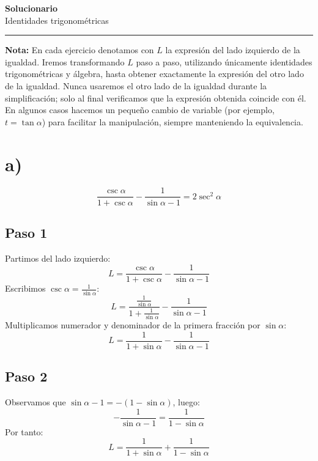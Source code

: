 \documentclass[12pt,a4paper]{article}
\begin{document}
\begin{center}

{\Huge \textbf{Solucionario}} \\[0.3cm]

{\LARGE Identidades trigonométricas}

\vspace{0.5cm}

\rule{0.9\textwidth}{0.5pt}

\end{center}

\vspace{0.8cm}

\noindent
\textbf{Nota:} En cada ejercicio denotamos con \(L\) la expresión del lado izquierdo de la igualdad. 
Iremos transformando \(L\) paso a paso, utilizando únicamente identidades trigonométricas y álgebra, 
hasta obtener exactamente la expresión del otro lado de la igualdad. Nunca usaremos el otro lado de la igualdad durante la simplificación; solo al final verificamos que la expresión obtenida coincide con él. 
En algunos casos hacemos un pequeño cambio de variable (por ejemplo, \(t = \tan\alpha\)) 
para facilitar la manipulación, siempre manteniendo la equivalencia.



\section*{a)}

\begin{identidad}
\[
\frac{\csc\alpha}{1+\csc\alpha}
-
\frac1{\sin\alpha-1}
=
2\sec^2\alpha
\]
\end{identidad}

\subsection*{Paso 1}
Partimos del lado izquierdo:
\[
L = \frac{\csc\alpha}{1+\csc\alpha} - \frac1{\sin\alpha-1}
\]
Escribimos \(\csc\alpha = \frac1{\sin\alpha}\):
\[
L = \frac{\frac1{\sin\alpha}}{1+\frac1{\sin\alpha}} - \frac1{\sin\alpha-1}
\]
Multiplicamos numerador y denominador de la primera fracción por \(\sin\alpha\):
\[
L = \frac1{1+\sin\alpha} - \frac1{\sin\alpha-1}
\]

\subsection*{Paso 2}
Observamos que \(\sin\alpha-1 = -(1-\sin\alpha)\), luego:
\[
-\frac1{\sin\alpha-1} = \frac1{1-\sin\alpha}
\]
Por tanto:
\[
L = \frac1{1+\sin\alpha} + \frac1{1-\sin\alpha}
\]
\end{document}
